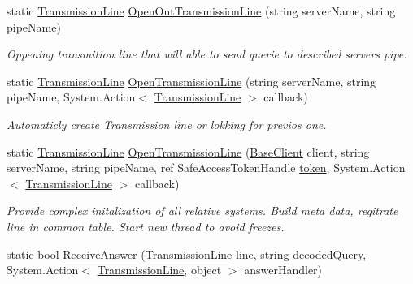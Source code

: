 \begin{DoxyCompactItemize}
static \mbox{\hyperlink{class_pipes_provider_1_1_client_1_1_transmission_line}{Transmission\+Line}} \mbox{\hyperlink{class_uniform_client_1_1_base_client_a0cbf7ac099cc033676f65c1236279811}{Open\+Out\+Transmission\+Line}} (string server\+Name, string pipe\+Name)
\begin{DoxyCompactList}\small\item\em Oppening transmition line that will able to send querie to described server\textquotesingle{}s pipe. \end{DoxyCompactList}\item 
static \mbox{\hyperlink{class_pipes_provider_1_1_client_1_1_transmission_line}{Transmission\+Line}} \mbox{\hyperlink{class_uniform_client_1_1_base_client_afc171a7bb5cdd654902bdd599ae64ea4}{Open\+Transmission\+Line}} (string server\+Name, string pipe\+Name, System.\+Action$<$ \mbox{\hyperlink{class_pipes_provider_1_1_client_1_1_transmission_line}{Transmission\+Line}} $>$ callback)
\begin{DoxyCompactList}\small\item\em Automaticly create Transmission line or lokking for previos one. \end{DoxyCompactList}\item 
static \mbox{\hyperlink{class_pipes_provider_1_1_client_1_1_transmission_line}{Transmission\+Line}} \mbox{\hyperlink{class_uniform_client_1_1_base_client_a1d27af079d0b045f9567ecaadfa56f88}{Open\+Transmission\+Line}} (\mbox{\hyperlink{class_uniform_client_1_1_base_client}{Base\+Client}} client, string server\+Name, string pipe\+Name, ref Safe\+Access\+Token\+Handle \mbox{\hyperlink{class_uniform_client_1_1_base_client_ad99bcf3d1afeed6eadca7035c926d2b7}{token}}, System.\+Action$<$ \mbox{\hyperlink{class_pipes_provider_1_1_client_1_1_transmission_line}{Transmission\+Line}} $>$ callback)
\begin{DoxyCompactList}\small\item\em Provide complex initalization of all relative systems. Build meta data, regitrate line in common table. Start new thread to avoid freezes. \end{DoxyCompactList}\item 
static bool \mbox{\hyperlink{class_uniform_client_1_1_base_client_a1725b07dfd0a616ed8ebbb48dc4e1088}{Receive\+Answer}} (\mbox{\hyperlink{class_pipes_provider_1_1_client_1_1_transmission_line}{Transmission\+Line}} line, string decoded\+Query, System.\+Action$<$ \mbox{\hyperlink{class_pipes_provider_1_1_client_1_1_transmission_line}{Transmission\+Line}}, object $>$ answer\+Handler)

\end{DoxyCompactItemize}
